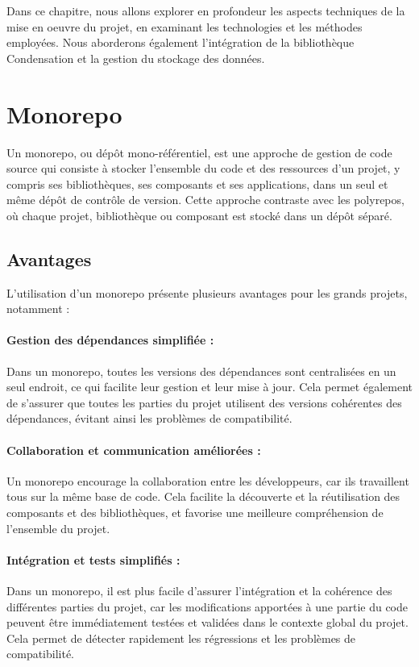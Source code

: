 Dans ce chapitre, nous allons explorer en profondeur les aspects techniques de la mise en oeuvre du projet, en examinant les technologies et les méthodes employées. Nous aborderons également l'intégration de la bibliothèque Condensation et la gestion du stockage des données.

\section{Monorepo}
Un monorepo, ou dépôt mono-référentiel, est une approche de gestion de code source qui consiste à stocker l'ensemble du code et des ressources d'un projet, y compris ses bibliothèques, ses composants et ses applications, dans un seul et même dépôt de contrôle de version. Cette approche contraste avec les polyrepos, où chaque projet, bibliothèque ou composant est stocké dans un dépôt séparé.

\subsection{Avantages}

L'utilisation d'un monorepo présente plusieurs avantages pour les grands projets, notamment :

\paragraph{Gestion des dépendances simplifiée :} Dans un monorepo, toutes les versions des dépendances sont centralisées en un seul endroit, ce qui facilite leur gestion et leur mise à jour. Cela permet également de s'assurer que toutes les parties du projet utilisent des versions cohérentes des dépendances, évitant ainsi les problèmes de compatibilité.
\paragraph{Collaboration et communication améliorées :} Un monorepo encourage la collaboration entre les développeurs, car ils travaillent tous sur la même base de code. Cela facilite la découverte et la réutilisation des composants et des bibliothèques, et favorise une meilleure compréhension de l'ensemble du projet.
\paragraph{Intégration et tests simplifiés :} Dans un monorepo, il est plus facile d'assurer l'intégration et la cohérence des différentes parties du projet, car les modifications apportées à une partie du code peuvent être immédiatement testées et validées dans le contexte global du projet. Cela permet de détecter rapidement les régressions et les problèmes de compatibilité.
